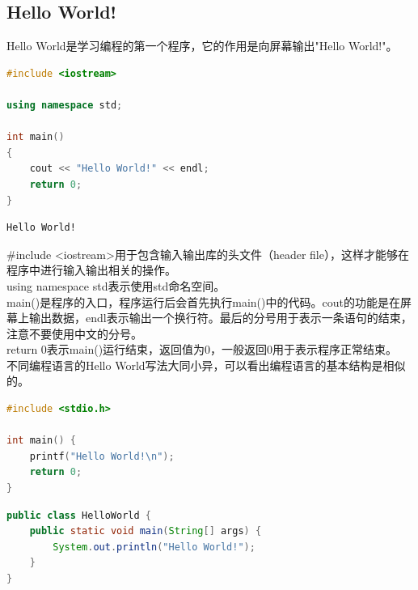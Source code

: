 \vspace{0.5cm}

\subsection{Hello World!}

Hello World是学习编程的第一个程序，它的作用是向屏幕输出"Hello World!"。\\


\begin{lstlisting}[language=C++]
#include <iostream>

using namespace std;

int main()
{
	cout << "Hello World!" << endl;
	return 0;
}
\end{lstlisting}

\begin{tcolorbox}
	\begin{verbatim}
Hello World!
	\end{verbatim}
\end{tcolorbox}

\#include <iostream>用于包含输入输出库的头文件（header file），这样才能够在程序中进行输入输出相关的操作。\\

using namespace std表示使用std命名空间。\\

main()是程序的入口，程序运行后会首先执行main()中的代码。cout的功能是在屏幕上输出数据，endl表示输出一个换行符。最后的分号用于表示一条语句的结束，注意不要使用中文的分号。\\

return 0表示main()运行结束，返回值为0，一般返回0用于表示程序正常结束。\\

不同编程语言的Hello World写法大同小异，可以看出编程语言的基本结构是相似的。\\


\begin{lstlisting}[language=C]
#include <stdio.h>

int main() {
	printf("Hello World!\n");
	return 0;
}
\end{lstlisting}

\vspace{0.5cm}


\begin{lstlisting}[language=Java]
public class HelloWorld {
    public static void main(String[] args) {
        System.out.println("Hello World!");
    }
}
\end{lstlisting}

